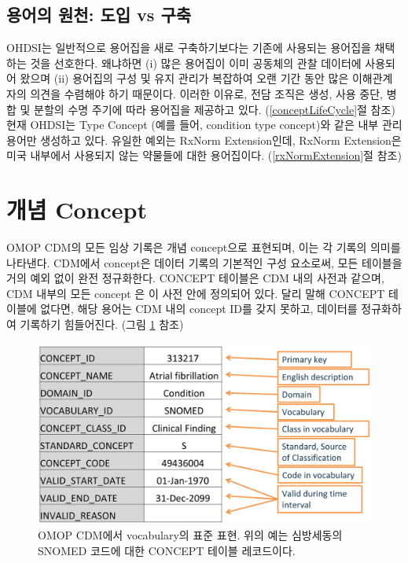 \documentclass[10.5pt]{book}
\theoremstyle{definition}
\theoremstyle{definition}
\theoremstyle{definition}
\theoremstyle{remark}
\begin{document}
\subsection{용어의 원천: 도입 vs 구축}\label{---vs-}

OHDSI는 일반적으로 용어집을 새로 구축하기보다는 기존에 사용되는 용어집을
채택하는 것을 선호한다. 왜냐하면 (i) 많은 용어집이 이미 공동체의 관찰
데이터에 사용되어 왔으며 (ii) 용어집의 구성 및 유지 관리가 복잡하여 오랜
기간 동안 많은 이해관계자의 의견을 수렴해야 하기 때문이다. 이러한
이유로, 전담 조직은 생성, 사용 중단, 병합 및 분할의 수명 주기에 따라
용어집을 제공하고 있다. (\ref{conceptLifeCycle}절 참조) 현재 OHDSI는
Type Concept (예를 들어, condition type concept)와 같은 내부 관리 용어만
생성하고 있다. 유일한 예외는 RxNorm Extension인데, RxNorm Extension은
미국 내부에서 사용되지 않는 약물들에 대한 용어집이다.
(\ref{rxNormExtension}절 참조)

\section{개념 Concept}\label{-concept}

OMOP CDM의 모든 임상 기록은 개념 concept으로 표현되며, 이는 각 기록의
의미를 나타낸다. CDM에서 concept은 데이터 기록의 기본적인 구성 요소로써,
모든 테이블을 거의 예외 없이 완전 정규화한다. CONCEPT 테이블은 CDM 내의
사전과 같으며, CDM 내부의 모든 concept 은 이 사전 안에 정의되어 있다.
달리 말해 CONCEPT 테이블에 없다면, 해당 용어는 CDM 내의 concept ID를
갖지 못하고, 데이터를 정규화하여 기록하기 힘들어진다. (그림
\ref{fig:concept} 참조) 

\begin{figure}

{\centering \includegraphics[width=0.9\linewidth]{images/StandardizedVocabularies/concept} 

}

\caption{OMOP CDM에서 vocabulary의 표준 표현. 위의 예는 심방세동의 SNOMED 코드에 대한 CONCEPT 테이블 레코드이다.}\label{fig:concept}
\end{figure}
\end{document}
